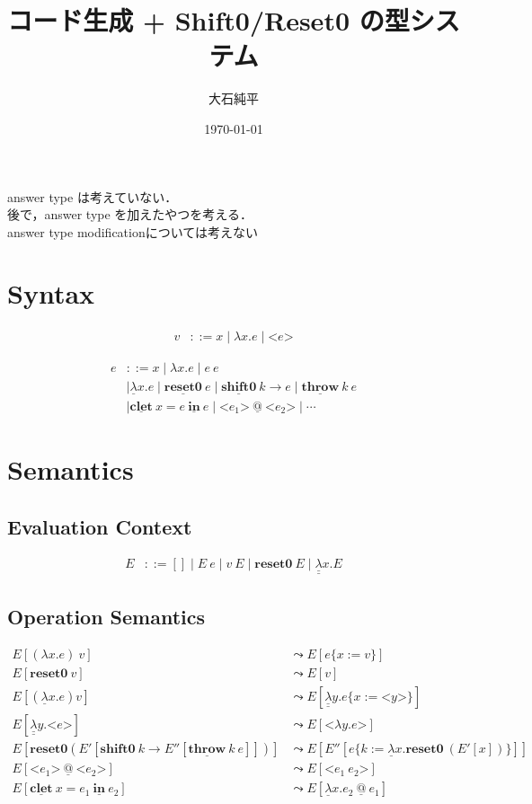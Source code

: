 \documentclass[10pt,a4j]{jarticle}
\title{コード生成 + Shift0/Reset0 の型システム}
\date{\today}
\author{大石純平}
\makeatletter
\newcommand\fun[2]{\lambda{#1}.{#2}}
\newcommand\Resetz{\textbf{reset0}}
\newcommand\Shiftz{\textbf{shift0}}
\newcommand\cfun[2]{\underline{\lambda}{#1}.{#2}}
\newcommand\ccfun[2]{\underline{\underline{\lambda}}{#1}.{#2}}
\newcommand\cResetz{\underline{\textbf{reset0}}}
\newcommand\cShiftz{\underline{\textbf{shift0}}}
\newcommand\cThrow{\underline{\textbf{throw}}}
\newcommand\cresetz[1]{\cResetz~{#1}}
\newcommand\cshiftz[2]{\cShiftz~{#1}\to{#2}}
\newcommand\cthrow[2]{\cThrow~{#1}~{#2}}
\newcommand\cLet{\underline{\textbf{clet}}}
\newcommand\cIn{\underline{\textbf{in}}}
\newcommand\clet[3]{\cLet~{#1}={#2}~\cIn~{#3}}
\newcommand\code[1]{\texttt{<}{#1}\texttt{>}}
\newcommand\lto{\leadsto}
\newcommand\cat{~\underline{@}~}
\makeatother
\begin{document}
\maketitle

answer type は考えていない．\\
後で，answer type を加えたやつを考える．\\
answer type modificationについては考えない

\section{Syntax}
\begin{align*}
  v & ::= x \mid \fun{x}{e} \mid \code{e}
\end{align*}

\begin{align*}
  e &::=  x \mid \fun{x}{e} \mid e~e \\
    & \mid \cfun{x}{e}
      \mid \cresetz{e}
      \mid \cshiftz{k}{e}
      \mid \cthrow{k}{e} \\
    & \mid \clet{x}{e}{e}
      \mid \code{e_1} \cat \code{e_2}
      \mid \cdots
\end{align*}


\section{Semantics}
\subsection{Evaluation Context}

\begin{align*}
  E & ::= [] \mid E~e \mid v~E \mid \Resetz~E \mid \ccfun{x}{E}
\end{align*}

\subsection{Operation Semantics}

\begin{align*}
  E[(\fun{x}{e})~v] &\lto E[e\{ x := v \}] \\
  E[\Resetz~v] &\lto E[v]\\
  E[(\cfun{x}{e}) v] &\lto E[\ccfun{y}{e\{ x := \code{y} \}}] \\
  E[\ccfun{y}{\code{e}}] &\lto E[\code{\fun{y}{e}}] \\
  E[\Resetz (E'[\Shiftz ~k \to E''[\cThrow ~k ~e]])] &\lto E[E''[e\{k := \cfun{x}{\Resetz ~(E'[x])} \}]] \\
  E[\code{e_1} \cat \code{e_2}] &\lto E[\code{e_1~e_2}] \\
  E[\clet{x}{e_1}{e_2}] &\lto E[\cfun{x}{e_2} \cat e_1]
\end{align*}
\end{document}
